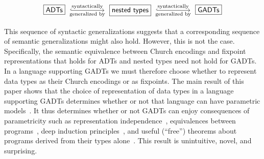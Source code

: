 \documentclass[submission,copyright,creativecommons]{eptcs}
\begin{document}
\vspace*{-0.1in}

\[\begin{tikzcd}[column sep = huge]
\text{\fbox{$\mathsf{ADTs}$}}\;
\ar[r,hookrightarrow,"\text{syntactically}","\text{generalized by}"']
& \;\text{\fbox{$\mathsf{nested~types}$}}\; \ar[r,hookrightarrow,"\text{syntactically}","\text{generalized by}"']
& \;\text{\fbox{$\mathsf{GADTs}$}}
\end{tikzcd}\]

\vspace*{-0.05in}

\noindent
This sequence of syntactic generalizations suggests that a
corresponding sequence of semantic generalizations might also hold.
However, this is not the case. Specifically, the semantic equivalence
between Church encodings and fixpoint representations that holds for
ADTs and nested types need not hold for GADTs. In a language
supporting GADTs we must therefore choose whether to represent data
types as their Church encodings or as fixpoints.  The main result of
this paper shows that the choice of representation of data types in a
language supporting GADTs determines whether or not that language can
have parametric models~\cite{rey83}. It thus determines whether or not
GADTs can enjoy consequences of parametricity such as representation
independence~\cite{adr09,dnb12}, equivalences between
programs~\cite{hd11}, deep induction principles~\cite{jg22,jp20},
and useful (``free'') theorems about programs derived from their types
alone~\cite{wad89}.  This result is unintuitive, novel, and
surprising.
\end{document}

